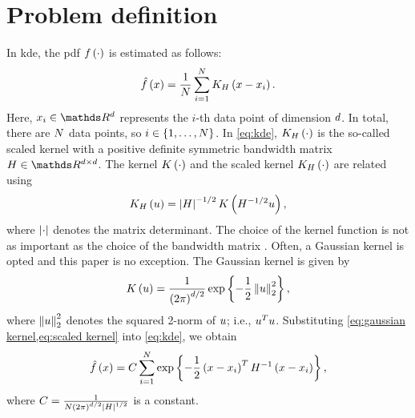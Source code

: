 \section{Problem definition}
\label{sec:problem}

In \ac{kde}, the \ac{pdf} $f\left( \cdot \right)$ is estimated as follows:
\begin{equation}
	\label{eq:kde}
	\hat{f}\left( x \right) = 
	\frac{1}{N} \sum_{i=1}^{N} 
	K_{H} \left( x - x_{i} \right).
\end{equation}
Here, $\datapoint{\indexdata} \in \realnumbers^{\dimension}$ represents the $i$-th data point of dimension $d$.
In total, there are $N$ data points, so $i \in \{1, \ldots, N\}$.
In \cref{eq:kde}, $K_{H} \left( \cdot \right)$ is the so-called scaled kernel with a positive definite symmetric bandwidth matrix $\bandwidthmatrix \in \realnumbers^{\dimension \times \dimension}$.
The kernel $K \left( \cdot \right)$ and the scaled kernel $K_{H} \left( \cdot \right)$ are related using
\begin{equation}
	\label{eq:scaled kernel}
	K_{H} \left( u \right)
	= \left| H \right|^{-1/2} K \left(  H^{-1/2} u  \right),
\end{equation}
where $\left| \cdot \right|$ denotes the matrix determinant.
The choice of the kernel function is not as important as the choice of the bandwidth matrix \autocite{turlach1993bandwidthselection, duong2007ks}.
Often, a Gaussian kernel is opted and this paper is no exception.
The Gaussian kernel is given by
\begin{equation}
	\label{eq:gaussian kernel}
	K \left( u \right) = \frac{1}{\left(2 \pi \right)^{d/2}} \exp\left\{  -\frac{1}{2} \left\Vert u \right\Vert_2^2 \right\},
\end{equation}
where $\left\Vert u \right\Vert_2^2$ denotes the squared 2-norm of $u$; i.e., $u^T u$.
Substituting \cref{eq:gaussian kernel,eq:scaled kernel} into \cref{eq:kde}, we obtain
\begin{equation}
	\label{eq:gaussian kde}
	\hat{f}\left( x \right)
	= C
	\sum_{i=1}^{N} 
	\exp\left\{ -\frac{1}{2} \left( x - x_{i} \right)^T H^{-1} \left( x - x_{i} \right) \right\},
\end{equation}
where $C=\frac{1}{N \left(2\pi\right)^{d/2} \left| H \right|^{1/2}}$ is a constant.

